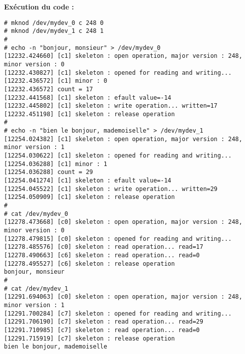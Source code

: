 \textbf{Exécution du code : } \\
\begin{lstlisting}
# mknod /dev/mydev_0 c 248 0
# mknod /dev/mydev_1 c 248 1
# 
# echo -n "bonjour, monsieur" > /dev/mydev_0
[12232.424660] [c1] skeleton : open operation, major version : 248, minor version : 0
[12232.430827] [c1] skeleton : opened for reading and writing...
[12232.436572] [c1] minor : 0
[12232.436572] count = 17
[12232.441568] [c1] skeleton : efault value=-14
[12232.445802] [c1] skeleton : write operation... written=17
[12232.451198] [c1] skeleton : release operation
#
# echo -n "bien le bonjour, mademoiselle" > /dev/mydev_1
[12254.024382] [c1] skeleton : open operation, major version : 248, minor version : 1
[12254.030622] [c1] skeleton : opened for reading and writing...
[12254.036288] [c1] minor : 1
[12254.036288] count = 29
[12254.041274] [c1] skeleton : efault value=-14
[12254.045522] [c1] skeleton : write operation... written=29
[12254.050909] [c1] skeleton : release operation
# 
# cat /dev/mydev_0
[12278.473668] [c0] skeleton : open operation, major version : 248, minor version : 0
[12278.479815] [c0] skeleton : opened for reading and writing...
[12278.485576] [c0] skeleton : read operation... read=17
[12278.490663] [c6] skeleton : read operation... read=0
[12278.495527] [c6] skeleton : release operation
bonjour, monsieur
# 
# cat /dev/mydev_1
[12291.694063] [c0] skeleton : open operation, major version : 248, minor version : 1
[12291.700284] [c7] skeleton : opened for reading and writing...
[12291.706190] [c7] skeleton : read operation... read=29
[12291.710985] [c7] skeleton : read operation... read=0
[12291.715919] [c7] skeleton : release operation
bien le bonjour, mademoiselle
\end{lstlisting}

